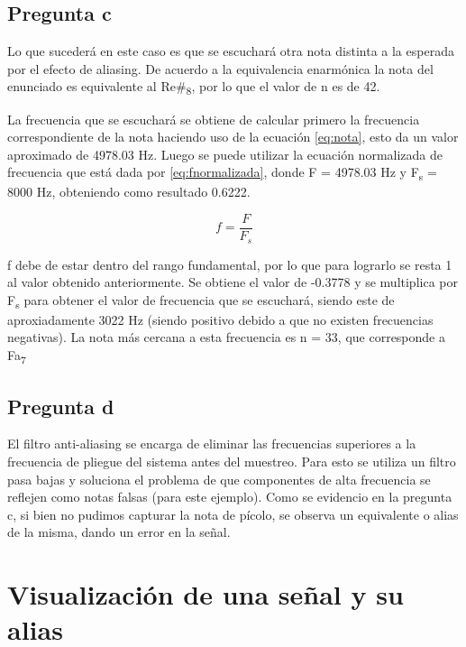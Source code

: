 \documentclass[conference]{IEEEtran}
\begin{document}
\subsection{Pregunta c}

Lo que sucederá en este caso es que se escuchará otra nota distinta a la esperada por el efecto de aliasing.
De acuerdo a la equivalencia enarmónica la nota del enunciado es equivalente al Re\#\textsubscript{8}, por lo que el valor de n es de 42. 

La frecuencia que se escuchará se obtiene de calcular primero la frecuencia correspondiente de la nota haciendo uso de la ecuación \eqref{eq:nota}, esto da un valor aproximado de 4978.03 Hz.
Luego se puede utilizar la ecuación normalizada de frecuencia que está dada por \eqref{eq:fnormalizada}, donde F = 4978.03 Hz y F\textsubscript{s} = 8000 Hz, obteniendo como resultado 0.6222.

\begin{equation}
f = \frac{F}{F_s}
\label{eq:fnormalizada}
\end{equation}

f debe de estar dentro del rango fundamental, por lo que para lograrlo se resta 1 al valor obtenido anteriormente. 
Se obtiene el valor de -0.3778 y se multiplica por F\textsubscript{s} para obtener el valor de frecuencia que se escuchará, siendo este de aproxiadamente 3022 Hz (siendo positivo debido a que no existen frecuencias negativas).
La nota más cercana a esta frecuencia es n = 33, que corresponde a Fa\textsubscript{7}

\subsection{Pregunta d}

El filtro anti-aliasing se encarga de eliminar las frecuencias superiores a la frecuencia de pliegue del sistema antes del muestreo.
Para esto se utiliza un filtro pasa bajas y soluciona el problema de que componentes de alta frecuencia se reflejen como notas falsas (para este ejemplo).
Como se evidencio en la pregunta c, si bien no pudimos capturar la nota de pícolo, se observa un equivalente o alias de la misma, dando un error en la señal.

\section{Visualización de una señal y su alias}
\end{document}
